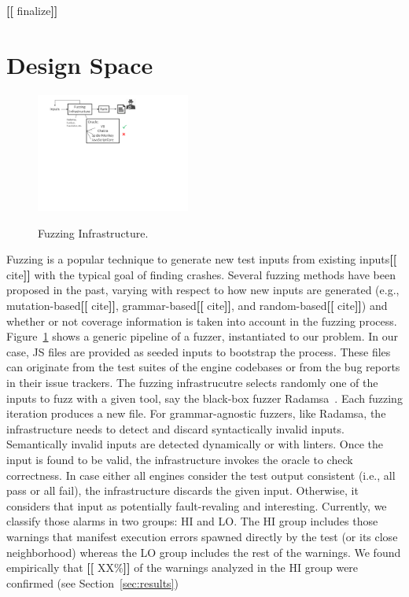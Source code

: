 \documentclass[11pt]{article}
\newcommand{\ie}{i.e.}
\newcommand{\eg}{e.g.}
\newcommand{\Fix}[1]{\textbf{[[}{\color{red} #1}\textbf{]]}}
\begin{document}
\Fix{finalize}


\section{Design Space}
\label{sec:design}

\begin{figure}
\vspace{-5ex}
  \centering
  \includegraphics[trim=20 350 200 0,clip,width=0.45\textwidth]{google-awards-workflow}
  \label{fig:workflow}
  \caption{Fuzzing Infrastructure.}
\end{figure}
Fuzzing is a popular technique to generate new test inputs from
existing inputs\Fix{cite} with the typical goal of finding
crashes. Several fuzzing methods have been proposed in the past,
varying with respect to how new inputs are generated (\eg{},
mutation-based\Fix{cite}, grammar-based\Fix{cite}, and
random-based\Fix{cite}) and whether or not coverage information is
taken into account in the fuzzing process. Figure~\ref{fig:workflow}
shows a generic pipeline of a fuzzer, instantiated to our problem. In
our case, JS files are provided as seeded inputs to bootstrap the
process. These files can originate from the test suites of the engine
codebases or from the bug reports in their issue trackers. The fuzzing
infrastrucutre selects randomly one of the inputs to fuzz with a given
tool, say the black-box fuzzer Radamsa~\cite{radamsa}. Each fuzzing
iteration produces a new file. For grammar-agnostic fuzzers, like
Radamsa, the infrastructure needs to detect and discard syntactically
invalid inputs. Semantically invalid inputs are detected dynamically
or with linters. Once the input is found to be valid, the
infrastructure invokes the oracle to check correctness. In case either
all engines consider the test output consistent (\ie{}, all pass or
all fail), the infrastructure discards the given input. Otherwise, it
considers that input as potentially fault-revaling and
interesting. Currently, we classify those alarms in two groups: HI and
LO. The HI group includes those warnings that manifest execution
errors spawned directly by the test (or its close neighborhood)
whereas the LO group includes the rest of the warnings. We found
empirically that \Fix{XX\%} of the warnings analyzed in the HI group
were confirmed (see Section~\ref{sec:results})
\end{document}
